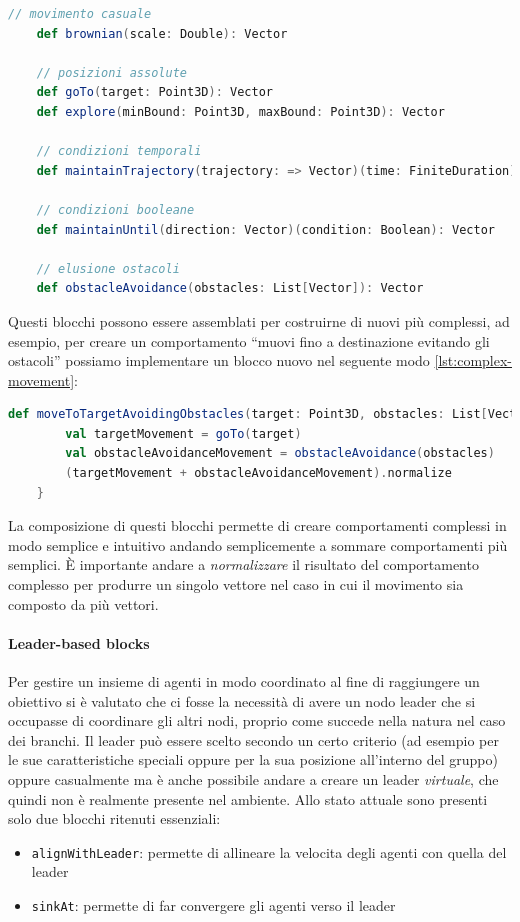 \documentclass[12pt,a4paper,openright,twoside]{book}
\begin{document}
\begin{lstlisting}[language=Scala, label={lst:movement-module}, caption={Funzioni del modulo di movimento}]
    // movimento casuale
    def brownian(scale: Double): Vector
    
    // posizioni assolute
    def goTo(target: Point3D): Vector
    def explore(minBound: Point3D, maxBound: Point3D): Vector

    // condizioni temporali
    def maintainTrajectory(trajectory: => Vector)(time: FiniteDuration):Vector

    // condizioni booleane
    def maintainUntil(direction: Vector)(condition: Boolean): Vector

    // elusione ostacoli
    def obstacleAvoidance(obstacles: List[Vector]): Vector
\end{lstlisting}

Questi blocchi possono essere assemblati per costruirne di nuovi più complessi, ad esempio, per creare un comportamento ``muovi fino a destinazione evitando gli ostacoli'' possiamo implementare un blocco nuovo nel seguente modo \cref{lst:complex-movement}:

\begin{lstlisting}[language=Scala, label={lst:complex-movement}, caption={Comportamento complesso}]
    def moveToTargetAvoidingObstacles(target: Point3D, obstacles: List[Vector]): Vector = {
        val targetMovement = goTo(target)
        val obstacleAvoidanceMovement = obstacleAvoidance(obstacles)
        (targetMovement + obstacleAvoidanceMovement).normalize
    }
\end{lstlisting}

La composizione di questi blocchi permette di creare comportamenti complessi in modo semplice e intuitivo andando semplicemente a sommare comportamenti più semplici. È importante andare a \textit{normalizzare} il risultato del comportamento complesso per produrre un singolo vettore nel caso in cui il movimento sia composto da più vettori.

\paragraph{Leader-based blocks} Per gestire un insieme di agenti in modo coordinato al fine di raggiungere un obiettivo si è valutato che ci fosse la necessità di avere un nodo leader che si occupasse di coordinare gli altri nodi, proprio come succede nella natura nel caso dei branchi. Il leader può essere scelto secondo un certo criterio (ad esempio per le sue caratteristiche speciali oppure per la sua posizione all'interno del gruppo) oppure casualmente ma è anche possibile andare a creare un leader \textit{virtuale}, che quindi non è realmente presente nel ambiente. Allo stato attuale sono presenti solo due blocchi ritenuti essenziali:
\begin{itemize}
    \item \verb|alignWithLeader|: permette di allineare la velocita degli agenti con quella del leader
    \item \verb|sinkAt|: permette di far convergere gli agenti verso il leader
\end{itemize} 
\end{document}
